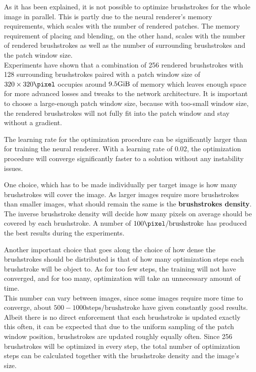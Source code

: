 As it has been explained, it is not possible to optimize brushstrokes for the whole image in parallel.
This is partly due to the neural renderer's memory requirements, which scales with the number of rendered patches.
The memory requirement of placing and blending, on the other hand, scales with the number of rendered brushstrokes as well as the number of surrounding brushstrokes and the patch window size.\\
Experiments have shown that a combination of 256 rendered brushstrokes with 128 surrounding brushstrokes paired with a patch window size of $320
\times320 \si{\pixel}$ occupies around $9.5 \si{\gibi \byte}$ of memory which leaves enough space for more advanced losses and tweaks to the network architecture.
It is important to choose a large-enough patch window size, because with too-small window size, the rendered brushstrokes will not fully fit into the patch window and stay without a gradient.

The learning rate for the optimization procedure can be significantly larger than for training the neural renderer.
With a learning rate of $0.02$, the optimization procedure will converge significantly faster to a solution without any instability issues.

One choice, which has to be made individually per target image is how many brushstrokes will cover the image.
As larger images require more brushstrokes than smaller images, what should remain the same is the \textbf{brushstrokes density}.
The inverse brushstroke density will decide how many pixels on average should be covered by each brushstroke.
A number of $100 \si{\pixel}/\text{brushstroke}$ has produced the best results during the experiments.

Another important choice that goes along the choice of how dense the brushstrokes should be distributed is that of how many optimization steps each brushstroke will be object to.
As for too few steps, the training will not have converged, and for too many, optimization will take an unnecessary amount of time.\\
This number can vary between images, since some images require more time to converge, about $500 - 1000 \text{steps}/\text{brushstroke}$ have given constantly good results.\\
Albeit there is no direct enforcement that each brushstroke is updated exactly this often, it can be expected that due to the uniform sampling of the patch window position, brushstrokes are updated roughly equally often.
Since 256 brushstrokes will be optimized in every step, the total number of optimization steps can be calculated together with the brushstroke density and the image's size.

